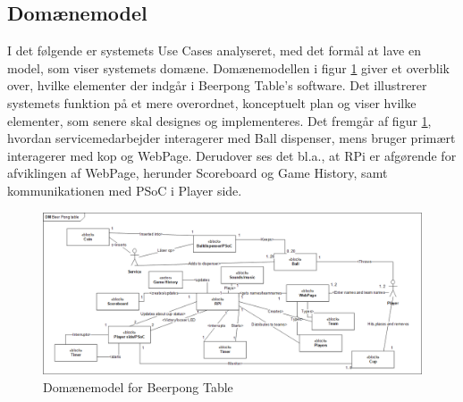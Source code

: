 \documentclass[Arkitektur/System_main.tex]{subfiles}
\begin{document}
\subsection{Domænemodel}

I det følgende er systemets Use Cases analyseret, med det formål at lave en model, som viser systemets domæne. Domænemodellen i figur \ref{fig:domain_model} giver et overblik over, hvilke elementer der indgår i Beerpong Table's software. Det illustrerer systemets funktion på et mere overordnet, konceptuelt plan og viser hvilke elementer, som senere skal designes og implementeres. Det fremgår af figur \ref{fig:domain_model}, hvordan servicemedarbejder interagerer med Ball dispenser, mens bruger primært interagerer med kop og WebPage. Derudover ses det bl.a., at RPi er afgørende for afviklingen af WebPage, herunder Scoreboard og Game History, samt kommunikationen med PSoC i Player side. 

\begin{figure}[H]
    \centering
    \includegraphics[angle=90, scale=0.7]{Arkitektur/Softwarearkitektur/Domaenemodel/graphics/domain_model.png}
    \caption{Domænemodel for Beerpong Table}
    \label{fig:domain_model}
\end{figure}
\end{document}
